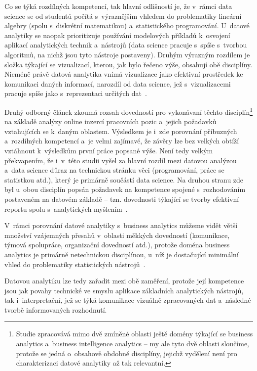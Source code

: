 Co se týká rozdílných kompetencí, tak hlavní odlišností je, že v~rámci data science se od studentů počítá s~výraznějším vhledem do problematiky lineární algebry (spolu s~diskrétní matematikou) a~statistického programování. U~datové analytiky se naopak prioritizuje používání modelových příkladů k~osvojení aplikací analytických technik a~nástrojů (data science pracuje s~spíše s~tvorbou algoritmů, na nichž jsou tyto nástroje postaveny). Druhým výrazným rozdílem je složka týkající se vizualizací, kterou, jak bylo řečeno výše, obsahují obě disciplíny. Nicméně právě datová analytika vnímá vizualizace jako efektivní prostředek ke komunikaci daných informací, narozdíl od data science, jež s~vizualizacemi pracuje spíše jako s~reprezentaci určitých dat~\parencite[110]{aasheim2015}.

Druhý odborný článek zkoumá rozsah dovedností pro vykonávaní těchto disciplín\footnote{Studie zpracovává mimo dvě zmíněné oblasti ještě domény týkající se business analytics a~business intelligence analytics – my ale tyto dvě oblasti sloučíme, protože se jedná o~obsahově obdobné disciplíny, jejichž vydělení není pro charakterizaci datové analytiky až tak relevantní.} na základě analýzy online inzercí pracovních pozic a~jejich požadavků vztahujících se k~daným oblastem. Výsledkem je i~zde porovnání příbuzných a~rozdílných kompetencí a~je velmi zajímavé, že závěry lze bez velkých obtíží vztáhnout k~výsledkům první práce popsané výše. Není tedy velkým překvapením, že i~v~této studii vyšel za hlavní rozdíl mezi datovou analýzou a~data science důraz na technickou stránku věci (programování, práce se statistkou atd.), který je primárně součástí data science. Na druhou stranu zde byl u~obou disciplín popsán požadavek na kompetence spojené s~rozhodováním postaveném na datovém základě -- tzn. dovednosti týkající se tvorby efektivní reportu spolu s~analytických myšlením~\parencite[248]{verma19}.

V~rámci porovnání datové analytiky s~business analytics můžeme vidět větší množství vzájemných přesahů v~oblasti měkkých dovedností (komunikace, týmová spolupráce, organizační dovedností atd.), protože doména business analytics je primárně netechnickou disciplínou, u~níž je dostačující minimální vhled do problematiky statistických nástrojů~\parencite[249]{verma19}.

Datovou analytiku lze tedy zařadit mezi obě zaměření, protože její kompetence jsou jak povahy technické ve smyslu aplikace základních analytických nástrojů, tak i~interpretační, jež se týká komunikace vizuálně zpracovaných dat a~následné tvorbě informovaných rozhodnutí.

